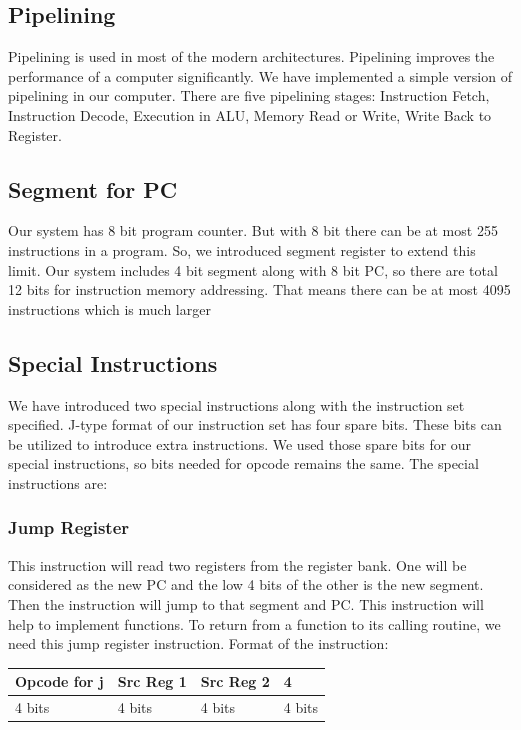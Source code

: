 \documentclass[12pt]{article}
\begin{document}
\subsection{Pipelining}
Pipelining is used in most of the modern architectures. Pipelining improves the performance of a computer significantly. We have implemented a simple version of pipelining in our computer. There are five pipelining stages: Instruction Fetch, Instruction Decode, Execution in ALU, Memory Read or Write, Write Back to Register.
\subsection{Segment for PC}
Our system has 8 bit program counter. But with 8 bit there can be at most 255 instructions in a program. So, we introduced segment register to extend this limit. Our system includes 4 bit segment along with 8 bit PC, so there are total 12 bits for instruction memory addressing. That means there can be at most 4095 instructions which is much larger 
\subsection{Special Instructions}
We have introduced two special instructions along with the instruction set specified. J-type format of our instruction set has four spare bits. These bits can be utilized to introduce extra instructions. We used those spare bits for our special instructions, so bits needed for opcode remains the same. The special instructions are:
\subsubsection{Jump Register}
This instruction will read two registers from the register bank. One will be considered as the new PC and the low 4 bits of the other is the new segment. Then the instruction will jump to that segment and PC. This instruction will help to implement functions. To return from a function to its calling routine, we need this jump register instruction. Format of the instruction: \\
\newline
\vspace{15}
\begin{tabular}{|p{3cm}|p{2cm}|p{4cm}|p{2.5cm}|}
    \hline
     Opcode for j & Src Reg 1 & Src Reg 2 & 4 \\
     \hline
     4 bits & 4 bits & 4 bits & 4 bits \\
     \hline
\end{tabular}
\end{document}
